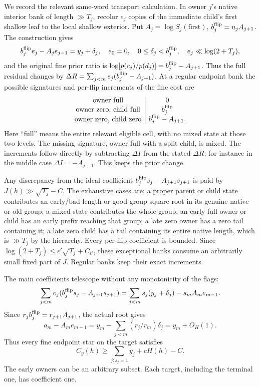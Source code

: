 We record the relevant same-word transport calculation. In owner $j$'s
native interior bank of length $\gg T_j$, recolor $e_j$ copies of the
immediate child's first shallow leaf to the local shallow exterior.
Put $A_j=\log S_j(\text{first})$, $b_j^{\rm flip}=u_jA_{j+1}$.
The construction gives
\begin{equation}
 b_j^{\rm flip}e_j-A_je_{j-1}=y_j+\delta_j,\quad e_0=0,\quad
 0\le\delta_j<b_j^{\rm flip},\quad e_j\ll\log(2+T_j),
 \label{history:cascade}
\end{equation}
and the original fine prior ratio is
$\log[p(c_j)/p(d_j)]=b_j^{\rm flip}-A_{j+1}$.
Thus the full residual changes by
$\Delta R=\sum_{j<m}e_j(b_j^{\rm flip}-A_{j+1})$.
At a regular endpoint bank the possible signatures and per-flip
increments of the fine cost are
\[
 \begin{array}{c|c}
 \text{owner full}&0\\
 \text{owner zero, child full}&b_j^{\rm flip}\\
 \text{owner zero, child zero}&b_j^{\rm flip}-A_{j+1}.
 \end{array}
\]
Here ``full'' means the entire relevant eligible cell, with no mixed
state at those two levels. The missing signature, owner full with a
split child, is mixed. The increments follow directly by subtracting
$\Delta I$ from the stated $\Delta R$; for instance in the middle
case $\Delta I=-A_{j+1}$. This keeps the prior change.

Any discrepancy from the ideal coefficient
$b_j^{\rm flip}s_j-A_{j+1}s_{j+1}$ is paid by
$J(h)\gg\sqrt{T_j}-C$. The exhaustive cases are: a proper parent
or child state contributes an early/bad length or good-group square
root in its genuine native or old group; a mixed state contributes the
whole group; an early full owner or child has an early prefix reaching
that group; a late zero owner has a zero tail containing it; a late
zero child has a tail containing its entire native length, which is
$\gg T_j$ by the hierarchy. Every per-flip coefficient is bounded.
Since $\log(2+T_j)\le\epsilon'\sqrt{T_j}+C_{\epsilon'}$, these
exceptional banks consume an arbitrarily small fixed part of $J$.
Regular banks keep their exact increments.

The main coefficients telescope without any monotonicity of the flags:
\[
 \sum_{j<m}e_j(b_j^{\rm flip}s_j-A_{j+1}s_{j+1})
 =\sum_{j<m}s_j(y_j+\delta_j)-s_mA_me_{m-1}.
\]
Since $r_jb_j^{\rm flip}=r_{j+1}A_{j+1}$, the actual root gives
\begin{equation}
 a_m-A_me_{m-1}
 =y_m-\sum_{j<m}(r_j/r_m)\delta_j=y_m+O_H(1).
 \label{history:terminal-cancellation}
\end{equation}
Thus every fine endpoint star on the target satisfies
\begin{equation}
 C_y(h)\ge\sum_{j:s_j=1}y_j+cH(h)-C.
 \label{history:target-endpoint}
\end{equation}
The early owners can be an arbitrary subset. Each target, including the
terminal one, has coefficient one.

